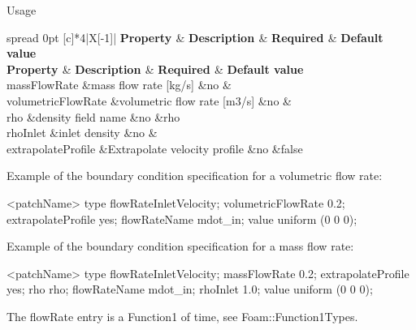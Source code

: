 \begin{DoxyParagraph}{Usage}
\tabulinesep=1mm
\begin{longtabu} spread 0pt [c]{*{4}{|X[-1]}|}
\hline
\rowcolor{\tableheadbgcolor}\PBS\centering \textbf{ {\bfseries  Property } }&\PBS\centering \textbf{ {\bfseries  Description } }&\PBS\centering \textbf{ {\bfseries  Required } }&\PBS\centering \textbf{ {\bfseries  Default value}  }\\
\endfirsthead
\hline
\endfoot
\hline
\rowcolor{\tableheadbgcolor}\PBS\centering \textbf{ {\bfseries  Property } }&\PBS\centering \textbf{ {\bfseries  Description } }&\PBS\centering \textbf{ {\bfseries  Required } }&\PBS\centering \textbf{ {\bfseries  Default value}  }\\
\endhead
{\ttfamily mass\+Flow\+Rate}  &mass flow rate \mbox{[}kg/s\mbox{]}  &no  &\\
{\ttfamily volumetric\+Flow\+Rate}  &volumetric flow rate \mbox{[}m3/s\mbox{]} &no  &\\
{\ttfamily rho}  &density field name  &no  &rho  \\
{\ttfamily rho\+Inlet}  &inlet density  &no  &\\
{\ttfamily extrapolate\+Profile}  &Extrapolate velocity profile  &no  &false  \\
\end{longtabu}
\begin{DoxyVerb}Example of the boundary condition specification for a volumetric flow rate:
\end{DoxyVerb}
 \begin{DoxyVerb}    <patchName>
    {
        type                flowRateInletVelocity;
        volumetricFlowRate  0.2;
        extrapolateProfile  yes;
        flowRateName        mdot_in;
        value               uniform (0 0 0);
    }\end{DoxyVerb}

\end{DoxyParagraph}
Example of the boundary condition specification for a mass flow rate\+: \begin{DoxyVerb}    <patchName>
    {
        type                flowRateInletVelocity;
        massFlowRate        0.2;
        extrapolateProfile  yes;
        rho                 rho;
        flowRateName        mdot_in;
        rhoInlet            1.0;
        value               uniform (0 0 0);
    }\end{DoxyVerb}


The {\ttfamily flow\+Rate} entry is a {\ttfamily Function1} of time, see Foam\+::\+Function1\+Types.

